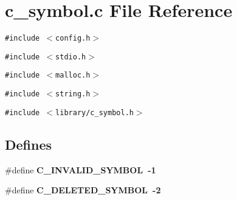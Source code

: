 \section{c\_\-symbol.c File Reference}
\label{c__symbol_8c}
{\tt \#include $<$config.h$>$}\par
{\tt \#include $<$stdio.h$>$}\par
{\tt \#include $<$malloc.h$>$}\par
{\tt \#include $<$string.h$>$}\par
{\tt \#include $<$library/c\_\-symbol.h$>$}\par
\subsection*{Defines}
\begin{CompactItemize}
\item 
\#define \bf{C\_\-INVALID\_\-SYMBOL}~-1
\item 
\#define \bf{C\_\-DELETED\_\-SYMBOL}~-2
\end{CompactItemize}
